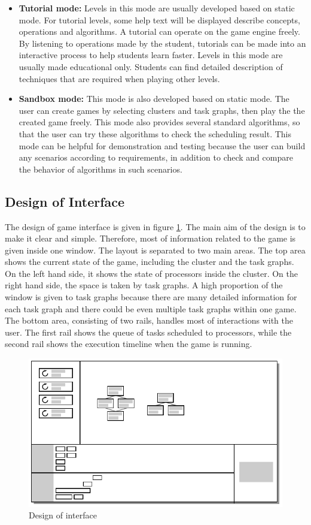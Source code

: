 \documentclass[msc,deptreport, cs]{infthesis}
\begin{document}
\begin{itemize}
  \item \textbf{Tutorial mode:} Levels in this mode are usually developed based on static mode. For tutorial levels, some help text will be displayed describe concepts, operations and algorithms. A tutorial can operate on the game engine freely. By listening to operations made by the student, tutorials can be made into an interactive process to help students learn faster. Levels in this mode are usually made educational only. Students can find detailed description of techniques that are required when playing other levels.

  \item \textbf{Sandbox mode:} This mode is also developed based on static mode. The user can create games by selecting clusters and task graphs, then play the the created game freely. This mode also provides several standard algorithms, so that the user can try these algorithms to check the scheduling result. This mode can be helpful for demonstration and testing because the user can build any scenarios according to requirements, in addition to check and compare the behavior of algorithms in such scenarios.
\end{itemize}

\subsection{Design of Interface} \label{sec:interface}

The design of game interface is given in figure \ref{fig:layout}. The main aim of the design is to make it clear and simple. Therefore, most of information related to the game is given inside one window. The layout is separated to two main areas. The top area shows the current state of the game, including the cluster and the task graphs. On the left hand side, it shows the state of processors inside the cluster. On the right hand side, the space is taken by task graphs. A high proportion of the window is given to task graphs because there are many detailed information for each task graph and there could be even multiple task graphs within one game. The bottom area, consisting of two rails, handles most of interactions with the user. The first rail shows the queue of tasks scheduled to processors, while the second rail shows the execution timeline when the game is running.

\begin{figure}[!htb]
  \centering
  \includegraphics[width=0.8\columnwidth]{layout.pdf}
  \caption{Design of interface}
  \label{fig:layout}
\end{figure}
\end{document}
